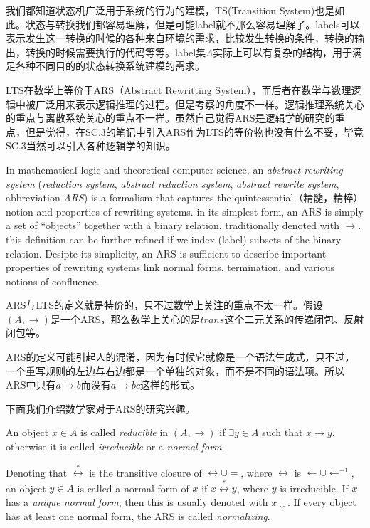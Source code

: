 我们都知道状态机广泛用于系统的行为的建模，TS(Transition System)也是如此。状态与转换我们都容易理解，但是可能label就不那么容易理解了。labels可以表示发生这一转换的时候的各种来自环境的需求，比较发生转换的条件，转换的输出，转换的时候需要执行的代码等等。label集$\Lambda$实际上可以有复杂的结构，用于满足各种不同目的的状态转换系统建模的需求。

LTS在数学上等价于ARS（Abstract Rewritting System），而后者在数学与数理逻辑中被广泛用来表示逻辑推理的过程。但是考察的角度不一样。逻辑推理系统关心的重点与离散系统关心的重点不一样。虽然自己觉得ARS是逻辑学的研究的重点，但是觉得，在SC.3的笔记中引入ARS作为LTS的等价物也没有什么不妥，毕竟SC.3当然可以引入各种逻辑学的知识。

In mathematical logic and theoretical computer science, an \emph{abstract rewriting system} (\emph{reduction system}, \emph{abstract reduction system}, \emph{abstract rewrite system}, abbreviation \emph{ARS}) is a formalism that captures the quintessential（精髓，精粹） notion and properties of rewriting systems. in its simplest form, an ARS is simply a set of ``objects'' together with a binary relation, traditionally denoted with $\rightarrow$. this definition can be further refined if we index (label) subsets of the binary relation. Desipte its simplicity, an ARS is sufficient to describe important properties of rewriting systems link normal forms, termination, and various notions of confluence.

ARS与LTS的定义就是特价的，只不过数学上关注的重点不太一样。假设$(A,\rightarrow)$是一个ARS，那么数学上关心的是$trans$这个二元关系的传递闭包、反射闭包等。

ARS的定义可能引起人的混淆，因为有时候它就像是一个语法生成式，只不过，一个重写规则的左边与右边都是一个单独的对象，而不是不同的语法项。所以ARS中只有$a\rightarrow b$而没有$a\rightarrow b c$这样的形式。

下面我们介绍数学家对于ARS的研究兴趣。

\begin{definition}
	An object $x\in A$ is called \emph{reducible} in $(A,\rightarrow)$ if $\exists y\in A$ such that $x\rightarrow y$. otherwise it is called \emph{irreducible} or a \emph{normal form}.
\end{definition}

\begin{definition}
	Denoting that $\overset{*}{\leftrightarrow}$ is the transitive closure of $\leftrightarrow \cup =$, where $\leftrightarrow$ is $\leftarrow \cup \leftarrow^{-1}$, an object $y\in A$ is called a normal form of $x$ if $x\overset{*}{\leftrightarrow} y$, where $y$ is irreducible. If $x$ has a \emph{unique normal form}, then this is usually denoted with $x\downarrow$. If every object has at least one normal form, the ARS is called \emph{normalizing}.
\end{definition}

